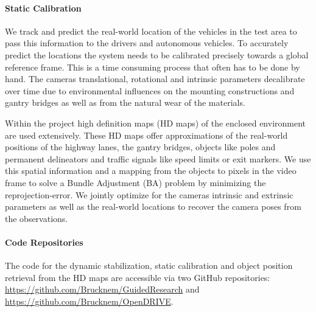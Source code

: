 \paragraph{Static Calibration}
We track and predict the real-world location of the vehicles in the test area to pass this information to the drivers and autonomous vehicles. 
To accurately predict the locations the system needs to be calibrated precisely towards a global reference frame. 
This is a time consuming process that often has to be done by hand. 
The cameras translational, rotational and intrinsic parameters decalibrate over time due to environmental influences on the mounting constructions and gantry bridges as well as from the natural wear of the materials.

Within the project high definition maps (HD maps) of the enclosed environment are used extensively. 
These HD maps offer approximations of the real-world positions of the highway lanes, the gantry bridges, objects like poles and permanent delineators and traffic signals like speed limits or exit markers.
We use this spatial information and a mapping from the objects to pixels in the video frame to solve a Bundle Adjustment (BA) problem by minimizing the reprojection-error.
We jointly optimize for the cameras intrinsic and extrinsic parameters as well as the real-world locations to recover the camera poses from the observations.

\paragraph{Code Repositories}
The code for the dynamic stabilization, static calibration and object position retrieval from the HD maps are accessible via two GitHub repositories: \url{https://github.com/Brucknem/GuidedResearch} and \url{https://github.com/Brucknem/OpenDRIVE}.
